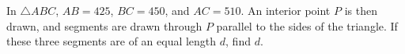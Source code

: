 In $\triangle ABC$, $AB= 425$, $BC=450$, and $AC=510$. An interior point $P$ is then drawn, and segments are drawn through $P$ parallel to the sides of the triangle. If these three segments are of an equal length $d$, find $d$.